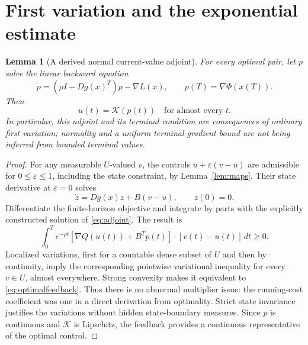 \documentclass[11pt,a4paper]{article}
\newtheorem{lemma}[theorem]{Lemma}
\begin{document}
\section{First variation and the exponential estimate}
\begin{lemma}[A derived normal current-value adjoint]\label{lem:adjoint}
For every optimal pair, let $p$ solve the linear backward equation
\begin{equation}\label{eq:adjoint}
 \dot p=(\rho I-Dg(x)^T)p-\nabla L(x),\qquad
 p(T)=\nabla\Phi(x(T)).
\end{equation}
Then
\begin{equation}\label{eq:optimalfeedback}
 u(t)=\mathcal K(p(t))\quad\text{for almost every }t.
\end{equation}
In particular, this adjoint and its terminal condition are consequences
of ordinary first variation; normality and a uniform terminal-gradient
bound are not being inferred from bounded terminal values.
\end{lemma}
\begin{proof}
For any measurable $U$-valued $v$, the controls
$u+\varepsilon(v-u)$ are admissible for $0\leq\varepsilon\leq1$,
including the state constraint, by Lemma~\ref{lem:maps}.
Their state derivative at $\varepsilon=0$ solves
\[
 \dot z=Dg(x)z+B(v-u),\qquad z(0)=0.
\]
Differentiate the finite-horizon objective and integrate by parts with
the explicitly constructed solution of \eqref{eq:adjoint}. The result is
\[
 \int_0^T e^{-\rho t}
      [\nabla Q(u(t))+B^Tp(t)]\cdot[v(t)-u(t)]\,dt\geq0.
\]
Localized variations, first for a countable dense subset of $U$ and then
by continuity, imply the corresponding pointwise variational inequality
for every $v\in U$, almost everywhere. Strong convexity makes it
equivalent to \eqref{eq:optimalfeedback}. Thus there is no abnormal
multiplier issue: the running-cost coefficient was one in a direct
derivation from optimality. Strict state invariance justifies the
variations without hidden state-boundary measures. Since $p$ is
continuous and $\mathcal K$ is Lipschitz, the feedback provides a
continuous representative of the optimal control.
\end{proof}
\end{document}
